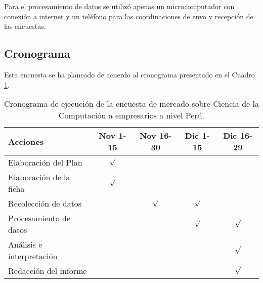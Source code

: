 Para el procesamiento de datos se utilizó apenas un microcomputador con conexión a internet y un teléfono para las coordinaciones de env­o y recepción de las encuestas.

\subsection{Cronograma}
Esta encuesta se ha planeado de acuerdo al cronograma presentado en el Cuadro \ref{tab:cronograma-de-la-encuesta}.

\begin{center}
\begin{table}[h!]
\begin{tabularx}{\textwidth}{|X|c|c|c|c|}\hline
\textbf{Acciones}       & \textbf{Nov 1-15} & \textbf{Nov 16-30} & D\textbf{ic 1-15} & \textbf{Dic 16-29} \\ \hline
Elaboración del Plan    &  $\surd$ &           &          &           \\ \hline
Elaboración de la ficha &  $\surd$ &           &          &           \\ \hline
Recolección de datos    &          & $\surd$   &  $\surd$ &           \\ \hline
Procesamiento de datos  &          &           &  $\surd$ &  $\surd$  \\ \hline
Análisis e interpretación&          &           &          &  $\surd$  \\ \hline
Redacción del informe   &          &           &          &  $\surd$  \\ \hline
\end{tabularx}
\caption{Cronograma de ejecución de la encuesta de mercado sobre Ciencia de la Computación a empresarios a nivel Perú.}
\label{tab:cronograma-de-la-encuesta}
\end{table}
\end{center}

